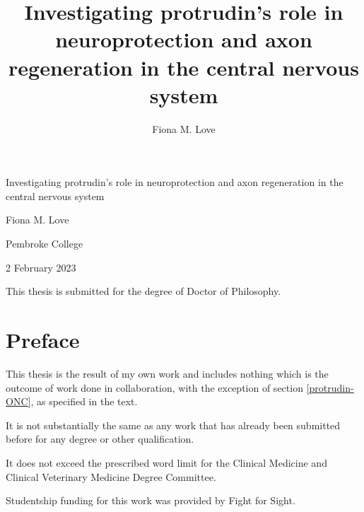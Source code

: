 \documentclass[
  12pt,
  a4paper,
]{book}
\title{Investigating protrudin's role in neuroprotection and axon regeneration in the central nervous system}
\author{Fiona M. Love}
\date{}
\begin{document}
\maketitle


\begin{titlepage}
\begin{center}

  \hspace{0pt}
  \vfill
  
  {\Huge
  Investigating protrudin's role in neuroprotection and axon regeneration in the central nervous system
  }\par
  
  {\Large
  Fiona M. Love
  }\par
  
   \vspace{1\baselineskip}
  
  {Pembroke College}\par
  {2 February 2023}\par
  
  \vspace{4\baselineskip}
  
  {This thesis is submitted for the degree of Doctor of Philosophy.}\par
  
  \vfill
  \hspace{0pt}

\end{center}
\end{titlepage}

\chapter*{Preface}\label{PREFACE}


This thesis is the result of my own work and includes nothing which is the outcome of work done in collaboration, with the exception of section \ref{protrudin-ONC}, as specified in the text.

It is not substantially the same as any work that has already been submitted before for any degree or other qualification.

It does not exceed the prescribed word limit for the Clinical Medicine and Clinical Veterinary Medicine Degree Committee.

Studentship funding for this work was provided by Fight for Sight.
\end{document}
